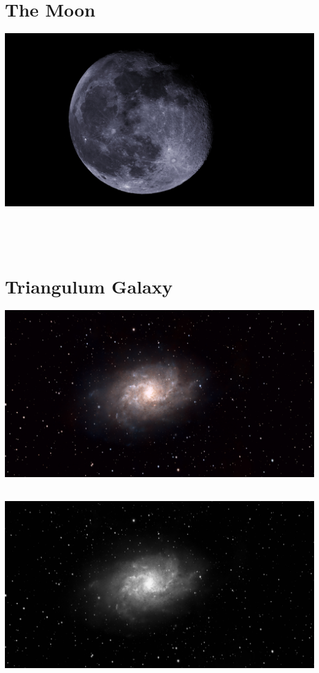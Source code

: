 \ \\\section{The Moon}
\includegraphics[width=\textwidth]{../Imaging//Original/The_Moon.jpg}
{\footnotesize\color{white}


}\ \\
\begin{center}
\end{center}
\ \\\section{Triangulum Galaxy}
\includegraphics[width=\textwidth]{../Imaging//Original/Triangulum_Galaxy.jpg}
{\footnotesize\color{white}


}\ \\
\includegraphics[width=\textwidth]{../Imaging//Grayscale/Triangulum_Galaxy.jpg}
